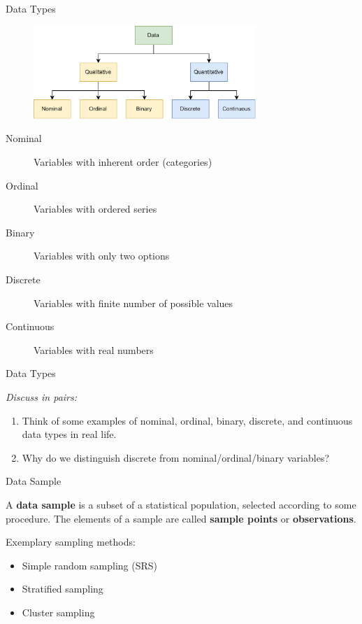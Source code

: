 \begin{frame}{Data Types}
    \begin{figure}
        \includegraphics[width=0.75\textwidth]{gfx/variable_types}
    \end{figure}
    \begin{description}
        \item[Nominal] Variables with inherent order (categories)%
        \item[Ordinal] Variables with ordered series%
        \item[Binary] Variables with only two options%
        \item[Discrete] Variables with finite number of possible values%
        \item[Continuous] Variables with real numbers%
    \end{description}
\end{frame}

\begin{frame}{Data Types}

    \emph{Discuss in pairs:}
    \begin{enumerate}
        \item Think of some examples of nominal, ordinal, binary,
        discrete, and continuous data types in real life.
        \item Why do we distinguish discrete from nominal/ordinal/binary variables?
    \end{enumerate}


\end{frame}

\begin{frame}{Data Sample}

A \textbf{data sample} is a subset of a statistical population, selected according to some procedure. The elements of a sample are called \textbf{sample points} or \textbf{observations}.

Exemplary sampling methods:

\begin{itemize}
    \item Simple random sampling (SRS)
    \item Stratified sampling
    \item Cluster sampling
\end{itemize}

\end{frame}

